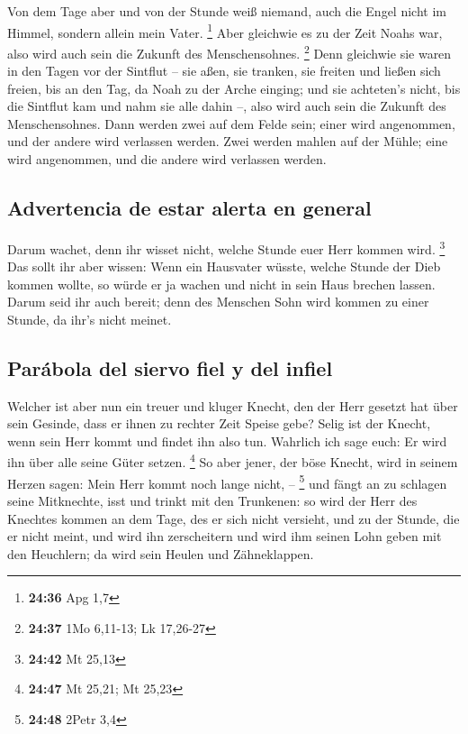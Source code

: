  Von dem Tage aber und von der Stunde weiß niemand, auch
die Engel nicht im Himmel, sondern allein mein Vater. \footnote{\textbf{24:36}
  Apg 1,7}  Aber gleichwie es zu der Zeit Noahs war, also
wird auch sein die Zukunft des Menschensohnes. \footnote{\textbf{24:37}
  1Mo 6,11-13; Lk 17,26-27}  Denn gleichwie sie waren in
den Tagen vor der Sintflut -- sie aßen, sie tranken, sie freiten und
ließen sich freien, bis an den Tag, da Noah zu der Arche einging;
 und sie achteten's nicht, bis die Sintflut kam und nahm
sie alle dahin --, also wird auch sein die Zukunft des Menschensohnes.
 Dann werden zwei auf dem Felde sein; einer wird
angenommen, und der andere wird verlassen werden.  Zwei
werden mahlen auf der Mühle; eine wird angenommen, und die andere wird
verlassen werden.

\hypertarget{advertencia-de-estar-alerta-en-general}{%
\subsection{Advertencia de estar alerta en
general}\label{advertencia-de-estar-alerta-en-general}}

 Darum wachet, denn ihr wisset nicht, welche Stunde euer
Herr kommen wird. \footnote{\textbf{24:42} Mt 25,13}  Das
sollt ihr aber wissen: Wenn ein Hausvater wüsste, welche Stunde der Dieb
kommen wollte, so würde er ja wachen und nicht in sein Haus brechen
lassen.  Darum seid ihr auch bereit; denn des Menschen
Sohn wird kommen zu einer Stunde, da ihr's nicht meinet.

\hypertarget{paruxe1bola-del-siervo-fiel-y-del-infiel}{%
\subsection{Parábola del siervo fiel y del
infiel}\label{paruxe1bola-del-siervo-fiel-y-del-infiel}}

 Welcher ist aber nun ein treuer und kluger Knecht, den
der Herr gesetzt hat über sein Gesinde, dass er ihnen zu rechter Zeit
Speise gebe?  Selig ist der Knecht, wenn sein Herr kommt
und findet ihn also tun.  Wahrlich ich sage euch: Er wird
ihn über alle seine Güter setzen. \footnote{\textbf{24:47} Mt 25,21; Mt
  25,23}  So aber jener, der böse Knecht, wird in seinem
Herzen sagen: Mein Herr kommt noch lange nicht, -- \footnote{\textbf{24:48}
  2Petr 3,4}  und fängt an zu schlagen seine Mitknechte,
isst und trinkt mit den Trunkenen:  so wird der Herr des
Knechtes kommen an dem Tage, des er sich nicht versieht, und zu der
Stunde, die er nicht meint,  und wird ihn zerscheitern
und wird ihm seinen Lohn geben mit den Heuchlern; da wird sein Heulen
und Zähneklappen.

